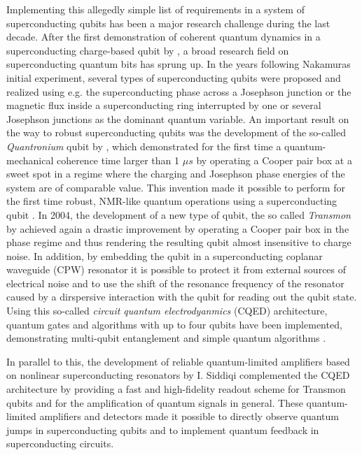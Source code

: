 Implementing this allegedly simple list of requirements in a system of superconducting qubits has been a major research challenge during the last decade. After the first demonstration of coherent quantum dynamics in a superconducting charge-based qubit by \cite{nakamura_coherent_1999}, a broad research field on superconducting quantum bits has sprung up. In the years following Nakamuras initial experiment, several types of superconducting qubits were proposed and realized using e.g. the superconducting phase \citep{martinis_energy-level_1985,martinis_rabi_2002} across a Josephson junction or the magnetic flux \citep{mooij_josephson_1999,chiorescu_coherent_2003} inside a superconducting ring interrupted by one or several Josephson junctions as the dominant quantum variable. An important result on the way to robust superconducting qubits was the development of the so-called {\it Quantronium} qubit by \cite{vion_manipulating_2002}, which demonstrated for the first time a quantum-mechanical coherence time larger than 1 $\mu s$ by operating a Cooper pair box at a sweet spot in a regime where the charging and Josephson phase energies of the system are of comparable value. This invention made it possible to perform for the first time robust, NMR-like quantum operations using a superconducting qubit \citep{collin_nmr-like_2004}. In 2004, the development of a new type of qubit, the so called {\it Transmon} by \cite{wallraff_strong_2004} achieved again a drastic improvement by operating a Cooper pair box in the phase regime and thus rendering the resulting qubit almost insensitive to charge noise. In addition, by embedding the qubit in a superconducting coplanar waveguide (CPW) resonator it is possible to protect it from external sources of electrical noise and to use the shift of the resonance frequency of the resonator caused by a dirspersive interaction with the qubit for reading out the qubit state\citep{blais_cavity_2004}. Using this so-called {\it circuit quantum electrodyanmics} (CQED) architecture, quantum gates and algorithms with up to four qubits have been implemented, demonstrating multi-qubit entanglement \citep{dicarlo_preparation_2010}and simple quantum algorithms \citep{dicarlo_demonstration_2009}.


In parallel to this, the development of reliable quantum-limited amplifiers based on nonlinear superconducting resonators by I. Siddiqi \citep{siddiqi_rf-driven_2004} complemented the CQED architecture by providing a fast and high-fidelity readout scheme for Transmon qubits \citep{siddiqi_dispersive_2006,mallet_single-shot_2009} and for the amplification of quantum signals in general. These quantum-limited amplifiers and detectors made it possible to directly observe quantum jumps in superconducting qubits \citep{vijay_observation_2011} and to implement quantum feedback in superconducting circuits.

